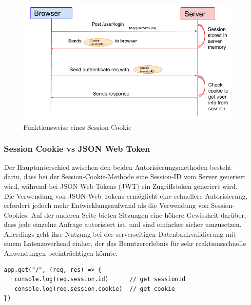 \begin{figure}[h!]
    \centering
    \includegraphics[width=0.7\linewidth]{pics/session-cookie-funktion.png}
    \caption{Funktionsweise eines Session Cookie}
    \label{fig:enter-label}
\end{figure}

\subsubsection{Session Cookie vs JSON Web Token}

Der Hauptunterschied zwischen den beiden Autorisierungsmethoden besteht darin, dass bei der Session-Cookie-Methode eine Session-ID vom Server generiert wird, während bei JSON Web Tokens (JWT) ein Zugriffstoken generiert wird. Die Verwendung von JSON Web Tokens ermöglicht eine schnellere Autorisierung, erfordert jedoch mehr Entwicklungsaufwand als die Verwendung von Session-Cookies. Auf der anderen Seite bieten Sitzungen eine höhere Gewissheit darüber, dass jede einzelne Anfrage autorisiert ist, und sind einfacher sicher umzusetzen. Allerdings geht ihre Nutzung bei der serverseitigen Datenbankvalidierung mit einem Latenzoverhead einher, der das Benutzererlebnis für sehr reaktionsschnelle Anwendungen beeinträchtigen könnte.

\begin{lstlisting}
app.get("/", (req, res) => {
   console.log(req.session.id)      // get sessionId
   console.log(req.session.cookie)  // get cookie
})
\end{lstlisting}

\cite{JWT}


